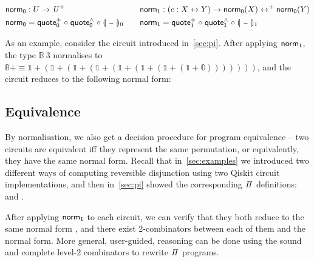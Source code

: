 \begin{definition}
  \begin{gather*}
    \begin{aligned}
      \normt_{0} & : U \to \UPlus                                            \\
      \normt_{0} & = \quotep_{0} \comp \quoteh_{0} \comp \gdenot{\blank}_{0}
    \end{aligned}
    \qquad
    \begin{aligned}
      \normt_{1} & : (c : X \iso Y) \to \normt_{0}(X) \isop \normt_{0}(Y)    \\
      \normt_{1} & = \quotep_{1} \comp \quoteh_{1} \comp \gdenot{\blank}_{1}
    \end{aligned}
  \end{gather*}
\end{definition}

\noindent
As an example, consider the  circuit introduced in~\cref{sec:pi}. After applying $\normt_{1}$, the
type $\mathbb{B}\ 3$ normalises to $\mathbb{8}+ \equiv \mathbb{1} + (\mathbb{1} + (\mathbb{1} + (\mathbb{1} +
  (\mathbb{1} + (\mathbb{1} + (\mathbb{1} + (\mathbb{1} + \mathbb{0})))))))$, and the circuit reduces to the following
normal form:

\medskip
\resetnormtwo{}

\subsection{Equivalence}

By normalisation, we also get a decision procedure for program equivalence -- two circuits are equivalent iff they
represent the same permutation, or equivalently, they have the same normal form. Recall that in~\cref{sec:examples} we
introduced two different ways of computing reversible disjunction using two Qiskit circuit implementations, and then
in~\cref{sec:pi} showed the corresponding $\mathit{\Pi}$ definitions:  and .

After applying $\normt_{1}$ to each circuit, we can verify that they both reduce to the same normal form
, and there exist 2-combinators between each of them and the normal form. More general,
user-guided, reasoning can be done using the sound and complete level-2 combinators to rewrite $\mathit{\Pi}$ programs.

